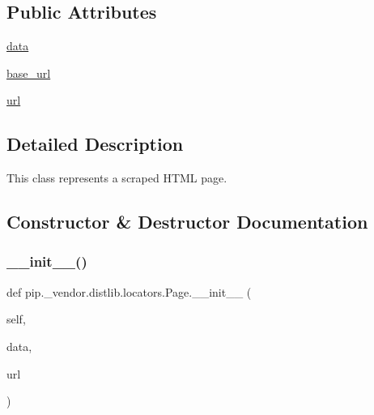 \subsection*{Public Attributes}
\begin{DoxyCompactItemize}
\item 
\hyperlink{classpip_1_1__vendor_1_1distlib_1_1locators_1_1Page_aeb5908bcd947624f7180e2c25f44ff60}{data}
\item 
\hyperlink{classpip_1_1__vendor_1_1distlib_1_1locators_1_1Page_a6daf04947e3fe072f38baa6af6e7016a}{base\+\_\+url}
\item 
\hyperlink{classpip_1_1__vendor_1_1distlib_1_1locators_1_1Page_ab937a600f7c2a6e391e9eb00fb700f98}{url}
\end{DoxyCompactItemize}


\subsection{Detailed Description}
\begin{DoxyVerb}This class represents a scraped HTML page.
\end{DoxyVerb}
 

\subsection{Constructor \& Destructor Documentation}
\mbox{\label{classpip_1_1__vendor_1_1distlib_1_1locators_1_1Page_a4c70c3a745d73fe0c0dfdde1e3eb37df}} 
\subsubsection{\texorpdfstring{\+\_\+\+\_\+init\+\_\+\+\_\+()}{\_\_init\_\_()}}
{\footnotesize\ttfamily def pip.\+\_\+vendor.\+distlib.\+locators.\+Page.\+\_\+\+\_\+init\+\_\+\+\_\+ (\begin{DoxyParamCaption}\item[{}]{self,  }\item[{}]{data,  }\item[{}]{url }\end{DoxyParamCaption})}

